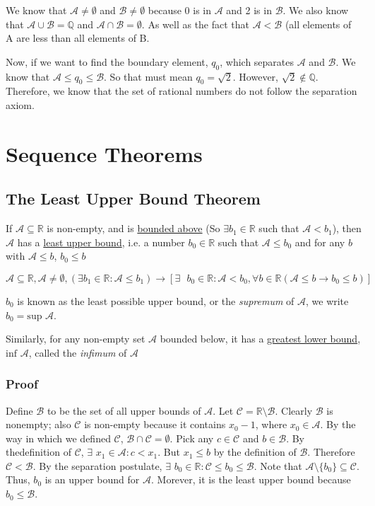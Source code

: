 \documentclass[11 pt, twoside]{article}
\begin{document}
We know that $\mathcal{A} \neq \emptyset$ and $\mathcal{B} \neq \emptyset$
because 0 is in $\mathcal{A}$ and 2 is in $\mathcal{B}$. We also know that
$\mathcal{A} \cup \mathcal{B} = \mathbb{Q}$ and $\mathcal{A} \cap \mathcal{B}
= \emptyset$. As well as the fact that $\mathcal{A} < \mathcal{B}$ (all elements of A are less than all elements of B.

Now, if we want to find the boundary element, $q_0$, which separates
$\mathcal{A}$ and $\mathcal{B}$. We know that $\mathcal{A} \leq q_0 \leq
\mathcal{B}$. So that must mean $q_0 = \sqrt{2}$. However, $\sqrt{2} \notin
\mathbb{Q}$. Therefore, we know that the set of rational numbers do not
follow the separation axiom.

\section{Sequence Theorems}

\subsection{The Least Upper Bound Theorem}

If $\mathcal{A} \subseteq \mathbb{R}$
is non-empty, and is \underline{bounded above} (So $\exists b_1 \in \mathbb{R}$
such that $\mathcal{A} < b_1$), then $\mathcal{A}$ has a
\underline{least upper bound}, i.e. a number $b_0 \in \mathbb{R}$ such that
$\mathcal{A} \leq b_0$ and for any $b$ with $\mathcal{A} \leq b$, $b_0 \leq b$

$$\mathcal{A}\subseteq\mathbb{R}, \mathcal{A} \neq \emptyset, (\exists\text{
} b_1 \in \mathbb{R}: \mathcal{A} \leq b_1)\to[\exists\text{ } b_0 \in
\mathbb{R}: \mathcal{A} < b_0, \forall b \in \mathbb{R} (\mathcal{A} \leq
b \to b_0 \leq b)]$$

$b_0$ is known as the least possible upper bound, or the \textit{supremum} of
$\mathcal{A}$, we write $b_0 = \textrm{sup } \mathcal{A}$.


Similarly, for any non-empty set $\mathcal{A}$ bounded below, it has a
\underline{greatest lower bound}, $\textrm{inf } \mathcal{A}$, called the \textit{infimum}
of $\mathcal{A}$

\subsubsection{Proof}
Define $\mathcal{B}$ to be the set of all upper bounds of $\mathcal{A}$. Let
$\mathcal{C} = \mathbb{R} \setminus \mathcal{B}$. Clearly $\mathcal{B}$ is
nonempty; also $\mathcal{C}$ is non-empty because it contains $x_0 - 1$, where
$x_0 \in \mathcal{A}$. By the way in which we defined $\mathcal{C}$,
$\mathcal{B} \cap \mathcal{C} = \emptyset$. Pick any $c \in \mathcal{C}$ and $b
\in \mathcal{B}$. By thedefinition of $\mathcal{C}$, $\exists$ $x_1 \in
\mathcal{A}: c < x_1$. But $x_1 \leq b$ by the definition of $\mathcal{B}$.
Therefore $\mathcal{C} < \mathcal{B}$. By
the separation postulate, $\exists$ $b_0 \in \mathbb{R}: \mathcal{C} \leq
b_0 \leq \mathcal{B}$. Note that $\mathcal{A}\setminus\{b_0\} \subseteq
\mathcal{C}$. Thus, $b_0$ is an upper bound for $\mathcal{A}$. Morever, it is
the least upper bound because $b_0 \leq \mathcal{B}$.
\end{document}
